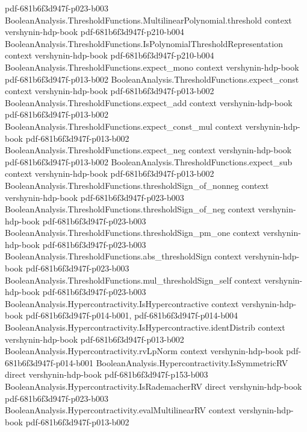 \begin{theorem}
  {pdf-681b6f3d947f-p023-b003}
\proofstep
  {BooleanAnalysis.ThresholdFunctions.MultilinearPolynomial.threshold}
  {context}
  {vershynin-hdp-book}
  {pdf-681b6f3d947f-p210-b004}
\proofstep
  {BooleanAnalysis.ThresholdFunctions.IsPolynomialThresholdRepresentation}
  {context}
  {vershynin-hdp-book}
  {pdf-681b6f3d947f-p210-b004}
\proofstep
  {BooleanAnalysis.ThresholdFunctions.expect_mono}
  {context}
  {vershynin-hdp-book}
  {pdf-681b6f3d947f-p013-b002}
\proofstep
  {BooleanAnalysis.ThresholdFunctions.expect_const}
  {context}
  {vershynin-hdp-book}
  {pdf-681b6f3d947f-p013-b002}
\proofstep
  {BooleanAnalysis.ThresholdFunctions.expect_add}
  {context}
  {vershynin-hdp-book}
  {pdf-681b6f3d947f-p013-b002}
\proofstep
  {BooleanAnalysis.ThresholdFunctions.expect_const_mul}
  {context}
  {vershynin-hdp-book}
  {pdf-681b6f3d947f-p013-b002}
\proofstep
  {BooleanAnalysis.ThresholdFunctions.expect_neg}
  {context}
  {vershynin-hdp-book}
  {pdf-681b6f3d947f-p013-b002}
\proofstep
  {BooleanAnalysis.ThresholdFunctions.expect_sub}
  {context}
  {vershynin-hdp-book}
  {pdf-681b6f3d947f-p013-b002}
\proofstep
  {BooleanAnalysis.ThresholdFunctions.thresholdSign_of_nonneg}
  {context}
  {vershynin-hdp-book}
  {pdf-681b6f3d947f-p023-b003}
\proofstep
  {BooleanAnalysis.ThresholdFunctions.thresholdSign_of_neg}
  {context}
  {vershynin-hdp-book}
  {pdf-681b6f3d947f-p023-b003}
\proofstep
  {BooleanAnalysis.ThresholdFunctions.thresholdSign_pm_one}
  {context}
  {vershynin-hdp-book}
  {pdf-681b6f3d947f-p023-b003}
\proofstep
  {BooleanAnalysis.ThresholdFunctions.abs_thresholdSign}
  {context}
  {vershynin-hdp-book}
  {pdf-681b6f3d947f-p023-b003}
\proofstep
  {BooleanAnalysis.ThresholdFunctions.mul_thresholdSign_self}
  {context}
  {vershynin-hdp-book}
  {pdf-681b6f3d947f-p023-b003}
\proofstep
  {BooleanAnalysis.Hypercontractivity.IsHypercontractive}
  {context}
  {vershynin-hdp-book}
  {pdf-681b6f3d947f-p014-b001,
    pdf-681b6f3d947f-p014-b004}
\proofstep
  {BooleanAnalysis.Hypercontractivity.IsHypercontractive.identDistrib}
  {context}
  {vershynin-hdp-book}
  {pdf-681b6f3d947f-p013-b002}
\proofstep
  {BooleanAnalysis.Hypercontractivity.rvLpNorm}
  {context}
  {vershynin-hdp-book}
  {pdf-681b6f3d947f-p014-b001}
\proofstep
  {BooleanAnalysis.Hypercontractivity.IsSymmetricRV}
  {direct}
  {vershynin-hdp-book}
  {pdf-681b6f3d947f-p153-b003}
\proofstep
  {BooleanAnalysis.Hypercontractivity.IsRademacherRV}
  {direct}
  {vershynin-hdp-book}
  {pdf-681b6f3d947f-p023-b003}
\proofstep
  {BooleanAnalysis.Hypercontractivity.evalMultilinearRV}
  {context}
  {vershynin-hdp-book}
  {pdf-681b6f3d947f-p013-b002}

\end{theorem}
